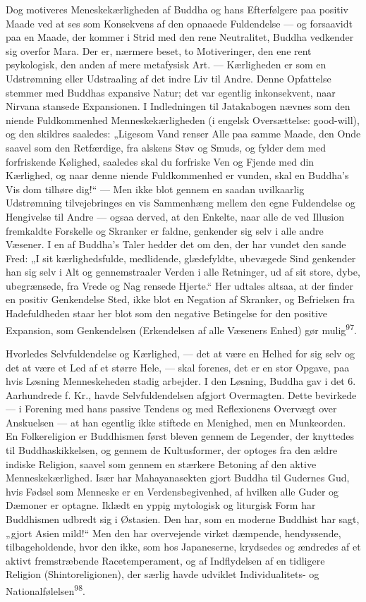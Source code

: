 \documentclass[12pt,a4paper,openany]{book}
\newcommand{\opage}[1]{\marginnote{\footnotesize\textit{[#1]}}}
\begin{document}
Dog motiveres Meneskekærligheden af Buddha og hans Efterfølgere paa
positiv Maade ved at ses som Konsekvens af den opnaaede Fuldendelse ---
og forsaavidt paa en Maade, der kommer i Strid med den rene Neutralitet,
Buddha vedkender sig overfor Mara. Der er, nærmere beset, to
Motiveringer, den ene rent psykologisk, den anden af mere metafysisk
Art. --- Kærligheden er som en Udstrømning eller Udstraaling af det
indre Liv til Andre. Denne Opfattelse stemmer med Buddhas expansive
Natur; det var egentlig inkonsekvent, naar Nirvana stansede Expansionen.
I Indledningen til Jatakabogen nævnes som den niende Fuldkommenhed
Menneskekærligheden (i engelsk Oversættelse: good-will), og den skildres
saaledes: „Ligesom Vand renser Alle paa samme Maade, den Onde saavel som
den Retfærdige, fra alskens Støv og Smuds, og fylder dem med
forfriskende Kølighed, saaledes skal du forfriske Ven og Fjende med din
Kærlighed, og naar denne niende Fuldkommenhed er vunden, skal en
Buddha’s Vis%
\opage{198}dom tilhøre dig!“ --- Men ikke blot gennem en saadan
uvilkaarlig Udstrømning tilvejebringes en vis Sammenhæng mellem den egne
Fuldendelse og Hengivelse til Andre --- ogsaa derved, at den Enkelte,
naar alle de ved Illusion fremkaldte Forskelle og Skranker er faldne,
genkender sig selv i alle andre Væsener. I en af Buddha’s Taler hedder
det om den, der har vundet den sande Fred: „I sit kærlighedsfulde,
medlidende, glædefyldte, ubevægede Sind genkender han sig selv i Alt og
gennemstraaler Verden i alle Retninger, ud af sit store, dybe,
ubegrænsede, fra Vrede og Nag rensede Hjerte.“ Her udtales altsaa, at
der finder en positiv Genkendelse Sted, ikke blot en Negation af
Skranker, og Befrielsen fra Hadefuldheden staar her blot som den
negative Betingelse for den positive Expansion, som Genkendelsen
(Erkendelsen af alle Væseners Enhed) gør mulig\textsuperscript{97}.

Hvorledes Selvfuldendelse og Kærlighed, --- det at være en Helhed for
sig selv og det at være et Led af et større Hele, --- skal forenes, det
er en stor Opgave, paa hvis Løsning Menneskeheden stadig arbejder. I den
Løsning, Buddha gav i det 6. Aarhundrede f. Kr., havde Selvfuldendelsen
afgjort Overmagten. Dette bevirkede --- i Forening med hans passive
Tendens og med Reflexionens Overvægt over Anskuelsen --- at han egentlig
ikke stiftede en Menighed, men en Munkeorden. En Folkereligion er
Buddhismen først bleven gennem de Legender, der knyttedes til
Buddhaskikkelsen, og gennem de Kultusformer, der optoges fra den ældre
indiske Religion, saavel som gennem en stærkere Betoning af den aktive
Menneskekærlighed. Især har Mahayanasekten gjort Buddha til Gudernes
Gud, hvis Fødsel som Menneske er en Verdensbegivenhed, af hvilken alle
Guder og Dæmoner er optagne. Iklædt en yppig mytologisk og liturgisk
Form har Buddhismen udbredt sig i Østasien. Den har, som en moderne
Buddhist har sagt, „gjort Asien mild!“ Men den har overvejende virket
dæmpende, hendyssende, tilbageholdende, hvor den ikke, som hos
Japaneserne, krydsedes og ændredes af et aktivt fremstræbende
Racetemperament, og af Indflydelsen af en tidligere Religion
(Shintoreligionen), der særlig havde udviklet Individualitets- og
Nationalfølelsen\textsuperscript{98}.
\end{document}
